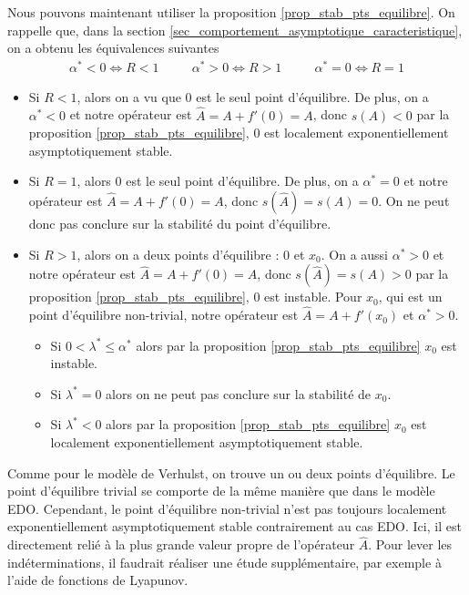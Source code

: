 Nous pouvons maintenant utiliser la proposition \ref{prop_stab_pts_equilibre}. On rappelle que, dans la section \ref{sec_comportement_asymptotique_caracteristique}, on a obtenu les équivalences suivantes 
\begin{align*}
    \alpha^* < 0 \iff R < 1 & \quad & \alpha^* > 0 \iff R > 1 & \quad & \alpha^*=0 \iff R=1
\end{align*}
\begin{itemize}
    \item Si $R<1$, alors on a vu que $0$ est le seul point d'équilibre. De plus, on a $\alpha^*<0$ et notre opérateur est $\hat{A}=A+f'(0)=A$, donc $s(A) <0$ par la proposition \ref{prop_stab_pts_equilibre}, $0$ est localement exponentiellement asymptotiquement stable.
    \item Si $R=1$, alors $0$ est le seul point d'équilibre. De plus, on a $\alpha^*=0$ et notre opérateur est $\hat{A}=A+f'(0)=A$, donc $s(\hat{A})=s(A) =0$. On ne peut donc pas conclure sur la stabilité du point d'équilibre.
    \item Si $R>1$, alors on a deux points d'équilibre : $0$ et $x_0$. On a aussi $\alpha^*>0$ et notre opérateur est $\hat{A}=A+f'(0)=A$, donc $s(\hat{A})=s(A) >0$ par la proposition \ref{prop_stab_pts_equilibre}, $0$ est instable. Pour $x_0$, qui est un point d'équilibre non-trivial, notre opérateur est $\hat{A}=A+f'(x_0)$ et $\alpha^*>0$. 
    \begin{itemize}
        \item Si $0 < \lambda^* \leq \alpha^*$ alors par la proposition \ref{prop_stab_pts_equilibre} $x_0$ est instable.
        \item Si $\lambda^*=0$ alors on ne peut pas conclure sur la stabilité de $x_0$.
        \item Si $\lambda^* < 0$ alors par la proposition \ref{prop_stab_pts_equilibre} $x_0$ est localement exponentiellement asymptotiquement stable.
    \end{itemize}
\end{itemize}

Comme pour le modèle de Verhulst, on trouve un ou deux points d'équilibre. Le point d'équilibre trivial se comporte de la même manière que dans le modèle EDO. Cependant, le point d'équilibre non-trivial n'est pas toujours localement exponentiellement asymptotiquement stable contrairement au cas EDO. Ici, il est directement relié à la plus grande valeur propre de l'opérateur $\hat{A}$. Pour lever les indéterminations, il faudrait réaliser une étude supplémentaire, par exemple à l'aide de fonctions de Lyapunov.